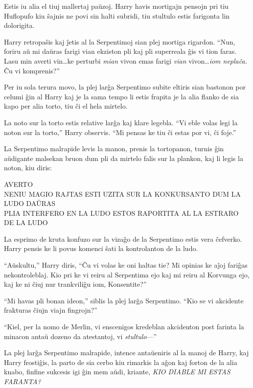 Estis iu alia el tiuj mallertaj paŭzoj. Harry havis mortigajn pensojn pri tiu
Huflopufo kiu ŝajnis ne povi sin halti subridi, tiu stultulo estis farigonta lin
dolorigita.

Harry retropaŝis kaj ĵetis al la Serpentimoj sian plej mortiga rigardon. ``Nun,
foriru aŭ mi daŭras farigi vian ekziston pli kaj pli superreala ĝis vi tion
faras. Lasu min averti vin\ldots ke perturbi \emph{mian} vivon emas farigi
\emph{vian} vivon\ldots \emph{iom neplaĉa.} Ĉu vi komprenis?''

Per iu sola terura movo, la plej larĝa Serpentimo subite eltiris sian bastonon
por celumi ĝin al Harry kaj je la sama tempo li estis frapita je la alia flanko
de sia kapo per alia torto, tiu ĉi el hela mirtelo.

La noto sur la torto estis relative larĝa kaj klare legebla. ``Vi eble
volas legi la noton sur la torto,'' Harry observis. ``Mi pensas ke
tiu ĉi estas por vi, ĉi foje.'' 

La Serpentimo malrapide levis la manon, prenis la tortopanon, turnis ĝin
aŭdigante malsekan bruon dum pli da mirtelo falis sur la plankon, kaj li legis
la noton, kiu diris:

\begin{center}
  AVERTO\\

  NENIU MAGIO RAJTAS ESTI UZITA SUR LA KONKURSANTO DUM LA LUDO DAŬRAS\\
  PLIA INTERFERO EN LA LUDO ESTOS RAPORTITA AL LA ESTRARO DE LA LUDO
\end{center}

La esprimo de kruta konfuzo sur la vizaĝo de la Serpentimo estis vera
ĉefverko. Harry pensis ke li povus komenci ŝati la kontrolanton de la
ludo.

``Aŭskultu,'' Harry diris, ``Ĉu vi volas ke oni haltas tie? Mi opinias ke aĵoj
fariĝas nekontroleblaj. Kio pri ke vi reiru al Serpentima ejo kaj mi reiru al
Korvunga ejo, kaj ke ni ĉiuj nur trankviliĝu iom, Konsentite?''

``Mi havas pli bonan ideon,'' siblis la plej larĝa Serpentimo. ``Kio se vi
akcidente frakturas ĉiujn viajn fingrojn?''

``Kiel, per la nomo de Merlin, vi enscenigos kredeblan akcidenton post
farinta la minacon antaŭ dozeno da atestantoj, vi \emph{stultulo}—''


La plej larĝa Serpentimo malrapide, intence antaŭeniris al la manoj de
Harry, kaj Harry frostiĝis, la parto de sia cerbo kiu rimarkis la aĝon
kaj forton de la alia knabo, finfine sukcesis igi ĝin mem aŭdi,
kriante, \emph{KIO DIABLE MI ESTAS FARANTA?}


